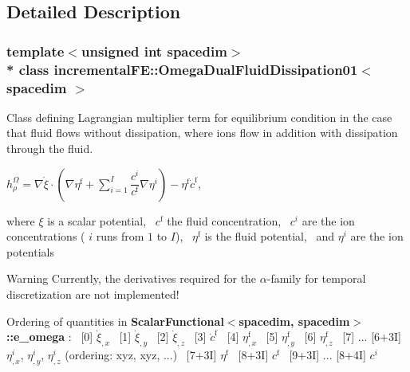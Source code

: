 \subsection{Detailed Description}
\subsubsection*{template$<$unsigned int spacedim$>$\\*
class incremental\+F\+E\+::\+Omega\+Dual\+Fluid\+Dissipation01$<$ spacedim $>$}

Class defining Lagrangian multiplier term for equilibrium condition in the case that fluid flows without dissipation, where ions flow in addition with dissipation through the fluid.

$ h^\Omega_\rho = \nabla \dot{\xi} \cdot \left(\nabla \eta^\mathrm{f} + \sum^I_{i=1} \dfrac{c^i}{c^\mathrm{f}} \nabla\eta^i \right) - \eta^\mathrm{f} \dot{c}^\mathrm{f}$,

where $\xi$ is a scalar potential,~\newline
 $c^\mathrm{f}$ the fluid concentration,~\newline
 $c^i$ are the ion concentrations ( $i$ runs from $1$ to $I$),~\newline
 $\eta^\mathrm{f}$ is the fluid potential,~\newline
 and $\eta^i$ are the ion potentials

\begin{DoxyWarning}{Warning}
Currently, the derivatives required for the $\alpha$-\/family for temporal discretization are not implemented!
\end{DoxyWarning}
Ordering of quantities in {\bf Scalar\+Functional$<$spacedim, spacedim$>$\+::e\+\_\+omega} \+:~\newline
\mbox{[}0\mbox{]} $\dot{\xi}_{,x}$~\newline
 \mbox{[}1\mbox{]} $\dot{\xi}_{,y}$~\newline
 \mbox{[}2\mbox{]} $\dot{\xi}_{,z}$~\newline
 \mbox{[}3\mbox{]} $\dot{c}^\mathrm{f}$~\newline
 \mbox{[}4\mbox{]} $\eta^\mathrm{f}_{,x}$~\newline
 \mbox{[}5\mbox{]} $\eta^\mathrm{f}_{,y}$~\newline
 \mbox{[}6\mbox{]} $\eta^\mathrm{f}_{,z}$~\newline
 \mbox{[}7\mbox{]} ... \mbox{[}6+3I\mbox{]} $\eta^i_{,x}$, $\eta^i_{,y}$, $\eta^i_{,z}$ (ordering\+: xyz, xyz, ...)~\newline
 \mbox{[}7+3I\mbox{]} $\eta^\mathrm{f}$~\newline
 \mbox{[}8+3I\mbox{]} $c^\mathrm{f}$~\newline
 \mbox{[}9+3I\mbox{]} ... \mbox{[}8+4I\mbox{]} $c^i$~\newline
 

